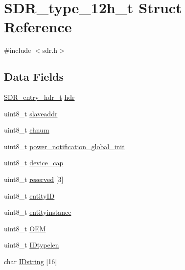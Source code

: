 \hypertarget{structSDR__type__12h__t}{\section{S\-D\-R\-\_\-type\-\_\-12h\-\_\-t Struct Reference}
\label{structSDR__type__12h__t}
}


{\ttfamily \#include $<$sdr.\-h$>$}

\subsection*{Data Fields}
\begin{DoxyCompactItemize}
\item 
\hyperlink{structSDR__entry__hdr__t}{S\-D\-R\-\_\-entry\-\_\-hdr\-\_\-t} \hyperlink{structSDR__type__12h__t_ab908cbc2027e590a589a2616680f7d68}{hdr}
\item 
uint8\-\_\-t \hyperlink{structSDR__type__12h__t_af330ddff1ea1c32a903127beac1fd29d}{slaveaddr}
\item 
uint8\-\_\-t \hyperlink{structSDR__type__12h__t_a7fca01e056eda23e5fafdbfc1901d3a9}{chnum}
\item 
uint8\-\_\-t \hyperlink{structSDR__type__12h__t_a2f53a4ba24d284690a35ef234e50bee2}{power\-\_\-notification\-\_\-global\-\_\-init}
\item 
uint8\-\_\-t \hyperlink{structSDR__type__12h__t_a5d4e3447daf56f07fe77c21809d4c3ae}{device\-\_\-cap}
\item 
uint8\-\_\-t \hyperlink{structSDR__type__12h__t_a76a8699765870919882dd5af6f7fb918}{reserved} \mbox{[}3\mbox{]}
\item 
uint8\-\_\-t \hyperlink{structSDR__type__12h__t_a0668c976ae141ed567fd1eb3baefa4ce}{entity\-I\-D}
\item 
uint8\-\_\-t \hyperlink{structSDR__type__12h__t_ac4ee61cf6d225f5e48eff587c107a93a}{entityinstance}
\item 
uint8\-\_\-t \hyperlink{structSDR__type__12h__t_aef25c5d422734e0a00957bdf51d36fb5}{O\-E\-M}
\item 
uint8\-\_\-t \hyperlink{structSDR__type__12h__t_a2681553010e45f02d01e328b7c131a2d}{I\-Dtypelen}
\item 
char \hyperlink{structSDR__type__12h__t_af217ad872492d470e110d35b1d218d09}{I\-Dstring} \mbox{[}16\mbox{]}
\end{DoxyCompactItemize}


